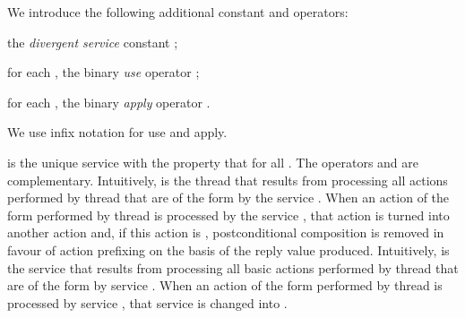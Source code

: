 \documentclass[fleqn]{llncs}
\begin{document}
We introduce the following additional constant and operators:
\begin{iteml}
\item
the \emph{divergent service} constant ;
\item
for each , the binary \emph{use} operator
;
\item
for each , the binary \emph{apply} operator
.
\end{iteml}
We use infix notation for use and apply.

 is the unique service  with the property that
 for all .
The operators  and  are
complementary.
Intuitively,  is the thread that results from processing
all actions performed by thread  that are of the form  by the
service .
When an action of the form  performed by thread  is processed by
the service , that action is turned into another action and, if this
action is , postconditional composition is removed in favour of
action prefixing on the basis of the reply value produced.
Intuitively,  is the service that results from
processing all basic actions performed by thread  that are of the
form  by service .
When an action of the form  performed by thread  is processed by
service , that service is changed into .
\end{document}
